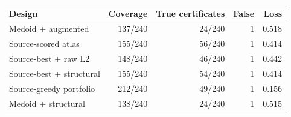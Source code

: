 \begin{tabular}{lrrrr}
\toprule
Design & Coverage & True certificates & False & Loss \\
\midrule
Medoid + augmented & 137/240 & 24/240 & 1 & 0.518 \\
Source-scored atlas & 155/240 & 56/240 & 1 & 0.414 \\
Source-best + raw L2 & 148/240 & 46/240 & 1 & 0.442 \\
Source-best + structural & 155/240 & 54/240 & 1 & 0.414 \\
Source-greedy portfolio & 212/240 & 49/240 & 1 & 0.156 \\
Medoid + structural & 138/240 & 24/240 & 1 & 0.515 \\
\bottomrule
\end{tabular}
